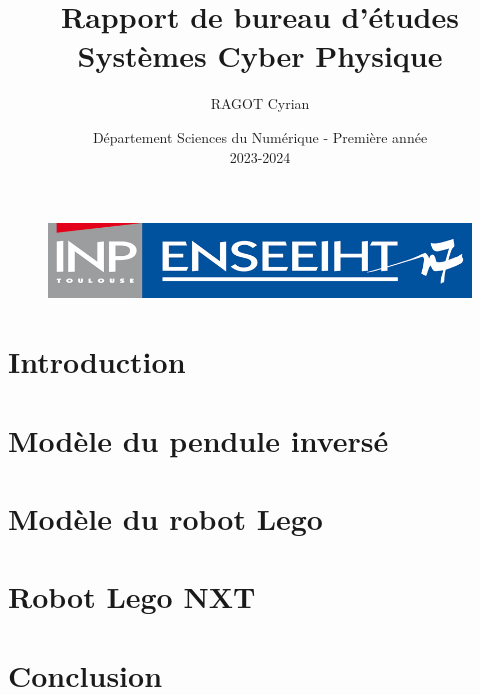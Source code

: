 \documentclass[11pt,french]{article} %
\begin{document}
\begin{figure}[t]
    \centering
		\advance\leftskip-0.5cm
    \includegraphics[width=12cm]{inp_n7.png} %
\end{figure}

\title{\vspace{1cm} \textbf{Rapport de bureau d'études\\Systèmes Cyber Physique}} 
\author{RAGOT Cyrian}
\date{\vspace{9cm} Département Sciences du Numérique - Première année \\
2023-2024 }

\maketitle

\newpage %
\tableofcontents %
\newpage

\section{Introduction}
\section{Modèle du pendule inversé}
\section{Modèle du robot Lego}
\section{Robot Lego NXT}
\section{Conclusion}
\end{document}
